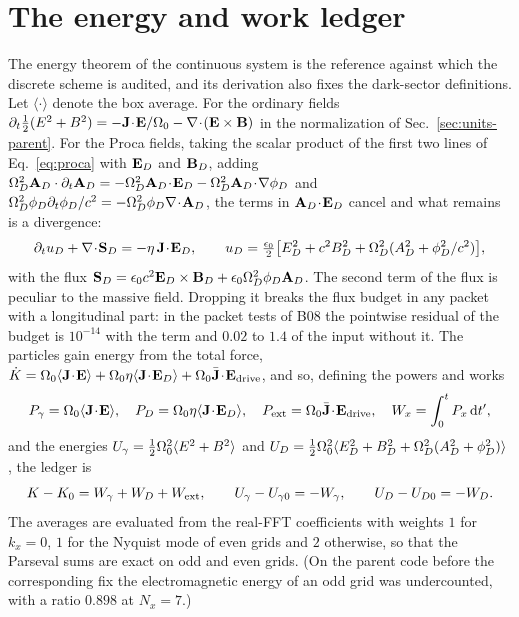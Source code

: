 \section{The energy and work ledger}\label{sec:ledger}

The energy theorem of the continuous system is the reference against which the discrete scheme is audited, and its derivation also fixes the dark-sector definitions. Let $\langle\cdot\rangle$ denote the box average. For the ordinary fields $\partial_t\tfrac12(E^2+B^2)=-\mathbf{J}\!\cdot\!\mathbf{E}/\Omega_0-\nabla\!\cdot\!(\mathbf{E}\times\mathbf{B})$ in the normalization of Sec.~\ref{sec:units-parent}. For the Proca fields, taking the scalar product of the first two lines of Eq.~\eqref{eq:proca} with $\mathbf{E}_D$ and $\mathbf{B}_D$, adding $\Omega_D^2\mathbf{A}_D\cdot\partial_t\mathbf{A}_D=-\Omega_D^2\mathbf{A}_D\!\cdot\!\mathbf{E}_D-\Omega_D^2\mathbf{A}_D\!\cdot\!\nabla\phi_D$ and $\Omega_D^2\phi_D\partial_t\phi_D/c^2=-\Omega_D^2\phi_D\nabla\!\cdot\!\mathbf{A}_D$, the terms in $\mathbf{A}_D\!\cdot\!\mathbf{E}_D$ cancel and what remains is a divergence:
\begin{equation}
\partial_tu_D+\nabla\!\cdot\!\mathbf S_D=-\eta\,\mathbf{J}\!\cdot\!\mathbf{E}_D,\qquad
u_D=\tfrac{\epsilon_0}{2}\big[E_D^2+c^2B_D^2+\Omega_D^2(A_D^2+\phi_D^2/c^2)\big],
\label{eq:procaenergy}
\end{equation}
with the flux $\mathbf S_D=\epsilon_0c^2\mathbf{E}_D\times\mathbf{B}_D+\epsilon_0\Omega_D^2\phi_D\mathbf{A}_D$. The second term of the flux is peculiar to the massive field. Dropping it breaks the flux budget in any packet with a longitudinal part: in the packet tests of B08 the pointwise residual of the budget is $10^{-14}$ with the term and $0.02$ to $1.4$ of the input without it. The particles gain energy from the total force, $\dot K=\Omega_0\langle \mathbf{J}\!\cdot\!\mathbf{E}\rangle+\Omega_0\eta\langle \mathbf{J}\!\cdot\!\mathbf{E}_D\rangle+\Omega_0\bar{\mathbf{J}}\!\cdot\!\mathbf{E}_{\rm drive}$, and so, defining the powers and works
\begin{equation}
P_\gamma=\Omega_0\langle \mathbf{J}\!\cdot\!\mathbf{E}\rangle,\quad P_D=\Omega_0\eta\langle \mathbf{J}\!\cdot\!\mathbf{E}_D\rangle,\quad P_{\rm ext}=\Omega_0\bar{\mathbf{J}}\!\cdot\!\mathbf{E}_{\rm drive},\quad W_x=\int_0^tP_x\,\mathrm{d} t',
\end{equation}
and the energies $U_\gamma=\tfrac12\Omega_0^2\langle E^2+B^2\rangle$ and $U_D=\tfrac12\Omega_0^2\langle E_D^2+B_D^2+\Omega_D^2(A_D^2+\phi_D^2)\rangle$, the ledger is
\begin{equation}
K-K_0=W_\gamma+W_D+W_{\rm ext},\qquad U_\gamma-U_{\gamma0}=-W_\gamma,\qquad U_D-U_{D0}=-W_D .
\label{eq:ledger}
\end{equation}
The averages are evaluated from the real-FFT coefficients with weights $1$ for $k_x=0$, $1$ for the Nyquist mode of even grids and $2$ otherwise, so that the Parseval sums are exact on odd and even grids. (On the parent code before the corresponding fix the electromagnetic energy of an odd grid was undercounted, with a ratio $0.898$ at $N_x=7$.)

